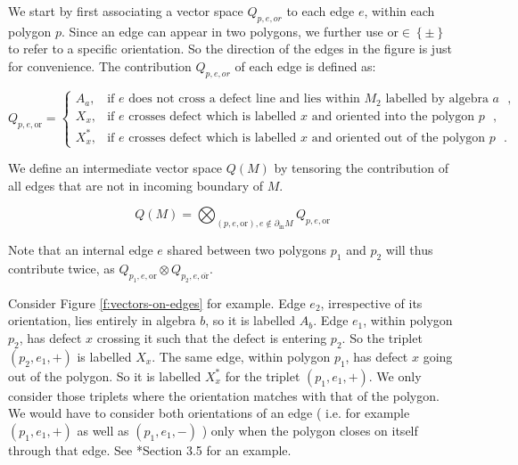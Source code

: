 \begin{defectfiguresetup}
We start by first associating a vector space $Q_{p,e,or}$ to each edge $e$, within each polygon $p$. Since an edge can appear in two polygons, we further use $\mathrm{or} \in  \left\{ \pm \right\} $ to refer to a specific orientation. So the direction of the edges in the figure is just for convenience. The contribution $Q_{p,e,or}$ of each edge is defined as:

\begin{equation}\label{e:q-definition}
	Q_{p,e,\mathrm{or}} =
	\begin{cases}
		A_a, & \text{if $e$ does not cross a defect line and lies within $M_2$ labelled by algebra $a$ },\\
		X_x, & \text{if $e$ crosses defect which is labelled $x$  and oriented into the polygon $p$ },\\
		X_x^*, & \text{if $e$ crosses defect which is labelled $x$  and oriented out of the polygon $p$ }.
	\end{cases}
	\end{equation}

We define an intermediate vector space $Q(M)$ by tensoring the contribution of all edges that are not in incoming boundary of $M$.

\begin{equation}
	Q(M) = \bigotimes_{(p,e,\mathrm{or}),e \notin \partial_{\mathrm{in}} M} Q_{p,e,\mathrm{or}}
\end{equation}

Note that an internal edge $e$ shared between two polygons $p_1$ and $p_2$ will thus contribute twice, as $Q_{p_1,e,\mathrm{or}} \otimes Q_{p_2,e,\bar{\mathrm{or}}}$.

Consider Figure \ref{f:vectors-on-edges} for example. Edge $e_2$, irrespective of its orientation, lies entirely in algebra $b$, so it is labelled $A_b$. Edge $e_1$, within polygon $p_2$, has defect $x$ crossing it such that the defect is entering $p_2$.  So the triplet $(p_2,e_1,+)$ is labelled $X_x$. The same edge, within polygon $p_1$, has defect $x$ going out of the polygon. So it is labelled $X_x^*$ for the triplet $(p_1,e_1,+)$.  We only consider those triplets where the orientation matches with that of the polygon. We would have to consider both orientations of an edge ( i.e. for example $(p_1,e_1,+)$ as well as $(p_1,e_1,-)$ ) only when the polygon closes on itself through that edge. See *{Section 3.5} for an example.


\end{defectfiguresetup}
